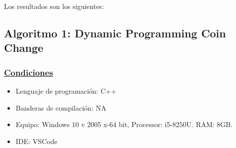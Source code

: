 \documentclass[12pt,letterpaper, titlepage, onecolumn]{article}
\begin{document}
	\par Los resultados son los siguientes:
	\pagebreak

	\subsection{Algoritmo 1: Dynamic Programming Coin Change}
		\subsubsection{\underline{Condiciones}}
			\begin{itemize}
				\item Lenguaje de programación: C++
				\item Banderas de compilación: NA
				\item Equipo: Windows 10 v 2005 x-64 bit, Processor: i5-8250U. RAM: 8GB.
				\item IDE: VSCode\\
			\end{itemize}
\end{document}
